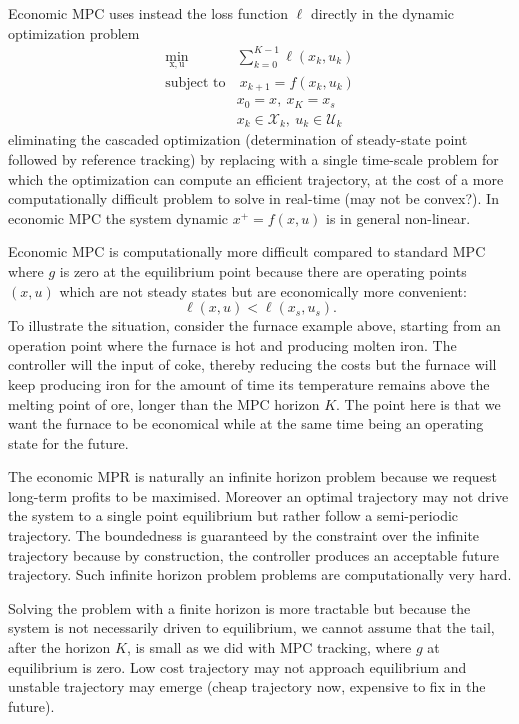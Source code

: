 \documentclass[11pt]{report}
\newcommand{\bs}[1]{\boldsymbol{#1}}
\newcommand{\bsu}{\bs{\mathrm{u}}}
\newcommand{\bsx}{\bs{\mathrm{x}}}
\begin{document}
Economic MPC uses instead the loss function $\ell$ directly in the dynamic optimization problem
\begin{align*}
  \min_{\bsx,\bsu} & \sum_{k=0}^{K-1} \ell(x_k,u_k) \\
  \text{subject to} &\ x_{k+1} = f(x_k,u_k) \\
                   & x_0 = x,\ x_K=x_s \\
                   & x_k\in \mathcal{X}_k,\ u_k\in \mathcal{U}_k
\end{align*}
eliminating the cascaded optimization (determination of steady-state point followed by reference tracking) by replacing with a single time-scale problem for which the optimization can compute an efficient trajectory, at the cost of a more computationally difficult problem to solve in real-time (may not be convex?). In economic MPC the system dynamic $x^+=f(x,u)$ is in general non-linear.

Economic MPC is computationally more difficult compared to standard MPC where $g$ is zero at the equilibrium point because there are operating points $(x,u)$ which are not steady states but are economically more convenient:
\begin{equation*}
  \ell(x,u) < \ell(x_s,u_s).
\end{equation*}
To illustrate the situation, consider the furnace example above, starting from an operation point where the furnace is hot and producing molten iron. The controller will the input of coke, thereby reducing the costs but the furnace will keep producing iron for the amount of time its temperature remains above the melting point of ore, longer than the MPC horizon $K$. The point here is that we want the furnace to be economical while at the same time being an operating state for the future.

The economic MPR is naturally an infinite horizon problem because we request long-term profits to be maximised. Moreover an optimal trajectory may not drive the system to a single point equilibrium but rather follow a semi-periodic trajectory. The boundedness is guaranteed by the constraint over the infinite trajectory because by construction, the controller produces an acceptable future trajectory. Such infinite horizon problem problems are computationally very hard.

Solving the problem with a finite horizon is more tractable but because the system is not necessarily driven to equilibrium, we cannot assume that the tail, after the horizon $K$, is small as we did with MPC tracking, where $g$ at equilibrium is zero. Low cost trajectory may not approach equilibrium and unstable trajectory may emerge (cheap trajectory now, expensive to fix in the future).
\end{document}

